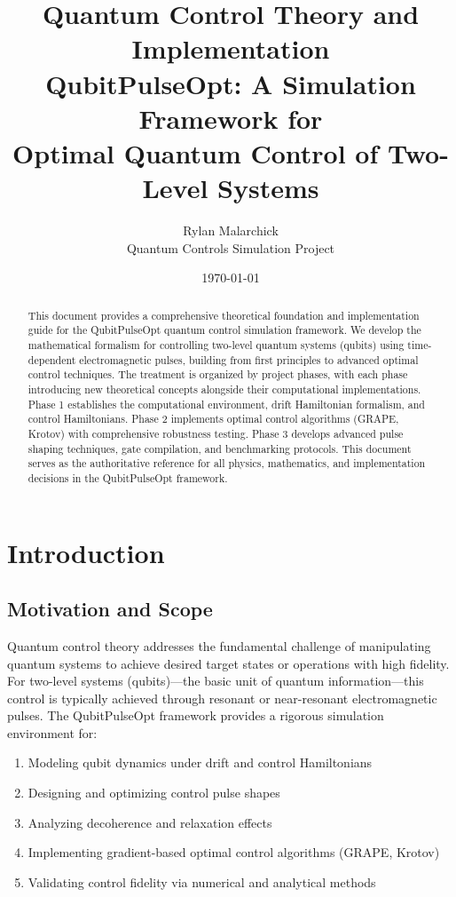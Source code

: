 \documentclass[11pt,a4paper]{article}
\title{\textbf{Quantum Control Theory and Implementation}\\
\Large QubitPulseOpt: A Simulation Framework for\\
Optimal Quantum Control of Two-Level Systems}
\author{Rylan Malarchick\\
\small Quantum Controls Simulation Project}
\date{\today}
\theoremstyle{definition}
\theoremstyle{remark}
\begin{document}
\maketitle

\begin{abstract}
This document provides a comprehensive theoretical foundation and implementation guide for the QubitPulseOpt quantum control simulation framework. We develop the mathematical formalism for controlling two-level quantum systems (qubits) using time-dependent electromagnetic pulses, building from first principles to advanced optimal control techniques. The treatment is organized by project phases, with each phase introducing new theoretical concepts alongside their computational implementations. Phase 1 establishes the computational environment, drift Hamiltonian formalism, and control Hamiltonians. Phase 2 implements optimal control algorithms (GRAPE, Krotov) with comprehensive robustness testing. Phase 3 develops advanced pulse shaping techniques, gate compilation, and benchmarking protocols. This document serves as the authoritative reference for all physics, mathematics, and implementation decisions in the QubitPulseOpt framework.
\end{abstract}

\tableofcontents
\newpage

\section{Introduction}

\subsection{Motivation and Scope}

Quantum control theory addresses the fundamental challenge of manipulating quantum systems to achieve desired target states or operations with high fidelity. For two-level systems (qubits)---the basic unit of quantum information---this control is typically achieved through resonant or near-resonant electromagnetic pulses. The QubitPulseOpt framework provides a rigorous simulation environment for:

\begin{enumerate}[label=(\roman*)]
    \item Modeling qubit dynamics under drift and control Hamiltonians
    \item Designing and optimizing control pulse shapes
    \item Analyzing decoherence and relaxation effects
    \item Implementing gradient-based optimal control algorithms (GRAPE, Krotov)
    \item Validating control fidelity via numerical and analytical methods
\end{enumerate}
\end{document}
